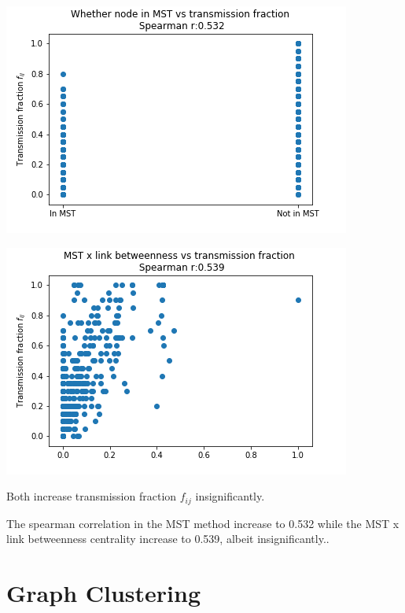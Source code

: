 \documentclass[a4paper,12pt]{article}
\begin{document}
  \begin{minipage}{0.5\textwidth}
    \includegraphics[width=\textwidth]{mst}
  \end{minipage}
  \begin{minipage}{0.5\textwidth}
    \includegraphics[width=\textwidth]{mstbetween}
  \end{minipage}

  Both increase transmission fraction $f_{ij}$ insignificantly.

  The spearman correlation in 
  the MST method increase to 0.532 while the MST x link betweenness centrality increase
  to 0.539, albeit insignificantly..

  \section{Graph Clustering}
\end{document}
